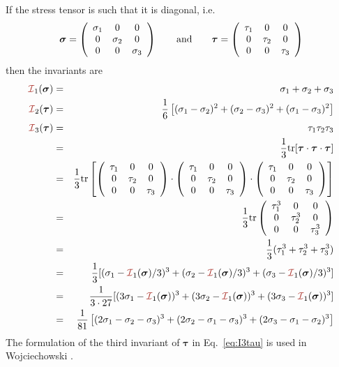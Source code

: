 If the stress tensor is such that it is diagonal, i.e.
\[
{\bm \sigma}= \left( \begin{array}{ccc}
\sigma_1 & 0 & 0 \\
0 & \sigma_2 & 0 \\
0 & 0 & \sigma_3
\end{array}\right)
\qquad
{\rm and}
\qquad
{\bm \tau}= \left( \begin{array}{ccc}
\tau_1 & 0 & 0 \\
0 & \tau_2 & 0 \\
0 & 0 & \tau_3
\end{array}\right)
\]
then the invariants are 
\begin{eqnarray}
{\III}_1({\bm \sigma}) &=& \sigma_1 + \sigma_2+ \sigma_3 \label{eq:I1s123}\\
{\III}_2({\bm \tau}) &=& \frac{1}{6}\left[(\sigma_{1}-\sigma_{2})^2 + (\sigma_{2}-\sigma_{3})^2 
+ (\sigma_{1}-\sigma_{3})^2 \right] \label{eq:I2s123}\\ 
{\III}_3({\bm \tau}) 
&=& \tau_1\tau_2\tau_3 \nn\\
&=& \frac{1}{3} {\rm tr}[{\bm \tau}\cdot{\bm \tau}\cdot {\bm \tau}]  \nn\\
&=& \frac{1}{3} {\rm tr}
\left[
\left(
\begin{array}{ccc}
\tau_1 & 0 & 0 \\
0 & \tau_2 & 0 \\
0 & 0 & \tau_3 
\end{array}
\right)
\cdot
\left(
\begin{array}{ccc}
\tau_1 & 0 & 0 \\
0 & \tau_2 & 0 \\
0 & 0 & \tau_3 
\end{array}
\right)
\cdot
\left(
\begin{array}{ccc}
\tau_1 & 0 & 0 \\
0 & \tau_2 & 0 \\
0 & 0 & \tau_3 
\end{array}
\right)
\right] \nn\\
&=&  \frac{1}{3} {\rm tr}
\left(
\begin{array}{ccc}
\tau_1^3 & 0 & 0 \\
0 & \tau_2^3 & 0 \\
0 & 0 & \tau_3^3 
\end{array}
\right) \nn\\
&=& \frac{1}{3}(\tau_1^3+\tau_2^3+\tau_3^3) \nn\\
&=&  \frac{1}{3} [ 
(\sigma_1-{\III}_1({\bm \sigma})/3)^3+  
(\sigma_2-{\III}_1({\bm \sigma})/3)^3+
(\sigma_3-{\III}_1({\bm \sigma})/3)^3 ]   \nonumber\\ 
&=&  \frac{1}{3\cdot 27} [ 
(3\sigma_1-{\III}_1({\bm \sigma}))^3+  
(3\sigma_2-{\III}_1({\bm \sigma}))^3+
(3\sigma_3-{\III}_1({\bm \sigma}))^3 ]   \nonumber\\ 
&=& \frac{1}{81}
\left[
(2\sigma_1-\sigma_2-\sigma_3)^3+
(2\sigma_2-\sigma_1-\sigma_3)^3+
(2\sigma_3-\sigma_1-\sigma_2)^3
\right] 
\label{eq:3rdinvb} \label{eq:I3tau}
\end{eqnarray}
The formulation of the third invariant of ${\bm \tau}$  in Eq.~\ref{eq:I3tau} 
is used in Wojciechowski \cite{wojc18}.











